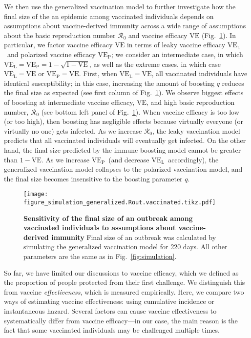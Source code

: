 \documentclass[12pt]{article}
\newcommand{\fref}[1]{Fig.~\ref{fig:#1}}
\newcommand{\VE}{\ensuremath{\mathrm{VE}}}
\newcommand{\VEP}{\ensuremath{\VE_{\mathrm{P}}}}
\newcommand{\VEL}{\ensuremath{\VE_{\mathrm{L}}}}
\begin{document}
We then use the generalized vaccination model to further investigate how the final size of the an epidemic among vaccinated individuals depends on assumptions about vaccine-derived immunity across a wide range of assumptions about the basic reproduction number $\mathcal R_0$ and vaccine efficacy $\VE$ (\fref{sensitivity}).
In particular, we factor vaccine efficacy $\VE$ in terms of leaky vaccine efficacy \VEL\ and polarized vaccine efficacy \VEP; we consider an intermediate case, in which $\VEL = \VEP = 1 - \sqrt{1-\VE}$, as well as the extreme cases, in which case $\VEL = \VE$ or $\VEP = \VE$.
First, when $\VEL = \VE$, all vaccinated individuals have identical susceptibility;
in this case, increasing the amount of boosting $q$ reduces the final size as expected (see first column of \fref{sensitivity}).
We observe biggest effects of boosting at intermediate vaccine efficacy, $\VE$, and high basic reproduction number, $\mathcal R_0$ (see bottom left panel of \fref{sensitivity}).
When vaccine efficacy is too low (or too high), then boosting has negligible effects because virtually everyone (or virtually no one) gets infected.
As we increase $\mathcal R_0$, the leaky vaccination model predicts that all vaccinated individuals will eventually get infected.
On the other hand, the final size predicted by the immune boosting model cannot be greater than $1-\VE$.
As we increase \VEP\ (and decrease \VEL\ accordingly), the generalized vaccination model collapses to the polarized vaccination model, and the final size becomes insensitive to the boosting parameter $q$.

\begin{figure}[!th]
\texttt{[image: figure\_simulation\_generalized.Rout.vaccinated.tikz.pdf]}
\caption{
\textbf{Sensitivity of the final size of an outbreak among vaccinated individuals to assumptions about vaccine-derived immunity}
Final size of an outbreak was calculated by simulating the generalized vaccination model for 220 days.
All other parameters are the same as in \fref{simulation}.
\label{fig:sensitivity}
}
\end{figure}

So far, we have limited our discussions to vaccine efficacy, which we defined as the proportion of people protected from their first challenge. 
We distinguish this from vaccine \textit{effectiveness}, which is measured empirically. 
Here, we compare two ways of estimating vaccine effectiveness: using cumulative incidence or instantaneous hazard.
Several factors can cause vaccine effectiveness to systematically differ from vaccine efficacy---in our case, the main reason is the fact that some vaccinated individuals may be challenged multiple times.
\end{document}
